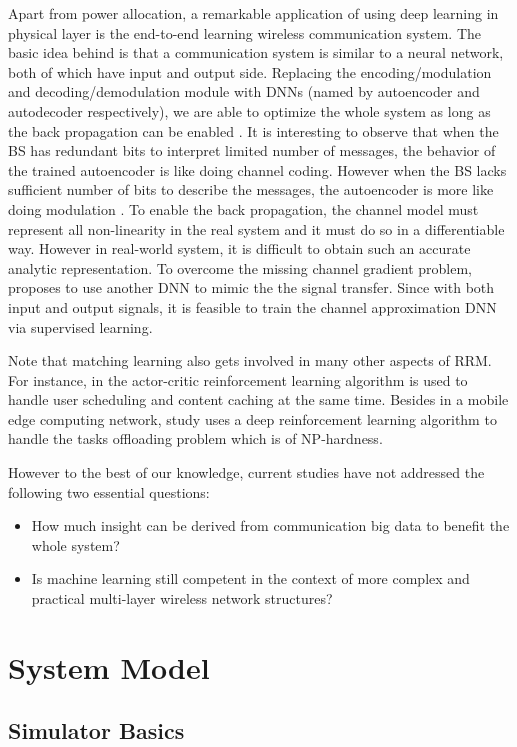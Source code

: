 \documentclass[conference,compsocconf]{IEEEtran}
\begin{document}
	Apart from power allocation, a remarkable application of using deep learning in physical layer is the end-to-end learning wireless communication system. The basic idea behind is that a communication system is similar to a neural network, both of which have input and output side. Replacing the encoding/modulation and decoding/demodulation module with DNNs (named by autoencoder and autodecoder respectively), we are able to optimize the whole system as long as the back propagation can be enabled . It is interesting to observe that when the BS has redundant bits to interpret limited number of messages, the behavior of the trained autoencoder is like doing channel coding. However when the BS lacks sufficient number of bits to describe the messages, the autoencoder is more like doing modulation \cite{o2017introduction,o2017deep}. To enable the back propagation, the channel model must represent all non-linearity in the real system and it must do so in a differentiable way. However in real-world system, it is difficult to obtain such an accurate analytic representation. To overcome the missing channel gradient problem, \cite{o2018physical} proposes to use another DNN to mimic the the signal transfer. Since with both input and output signals, it is feasible to  train the channel approximation DNN via supervised learning. 
	
	Note that matching learning also gets involved in many other aspects of RRM.  For instance, in \cite{wei2018joint} the actor-critic reinforcement learning algorithm is used to handle user scheduling and content caching at the same time. Besides in a mobile edge computing network, study \cite{huang2019deep} uses a deep reinforcement learning algorithm to handle the tasks offloading problem which is of NP-hardness.
	
	However to the best of our knowledge, current studies have not addressed the following two essential questions:
	\begin{itemize}
		\item How much insight can be derived from communication big data to benefit the whole system?
		\item Is machine learning still competent in the context of more complex and practical multi-layer wireless network structures?
	\end{itemize}
	
\section{System Model}
\subsection{Simulator Basics}\label{setup}
\end{document}

